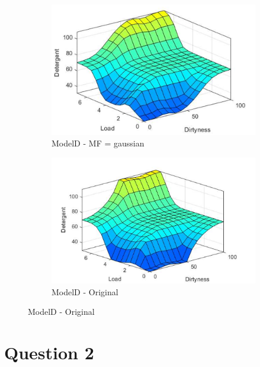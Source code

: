 \documentclass[11pt]{article}
\begin{document}
\begin{enumerate}[label=(\alph*)]
  \begin{figure}[ht!]
  \centering
  \begin{subfigure}{.5\textwidth}
    \centering
    \includegraphics[width=.9\linewidth]{res/modelD_gaussian}
    \caption{ModelD - MF = gaussian}
    \label{fig:sub1}
  \end{subfigure}%
  \begin{subfigure}{.5\textwidth}
    \centering
    \includegraphics[width=.9\linewidth]{res/image2}
    \caption{ModelD - Original}
    \label{fig:sub2}
  \end{subfigure}
  \end{figure}

\end{enumerate}



\section*{Question 2}
\end{document}
